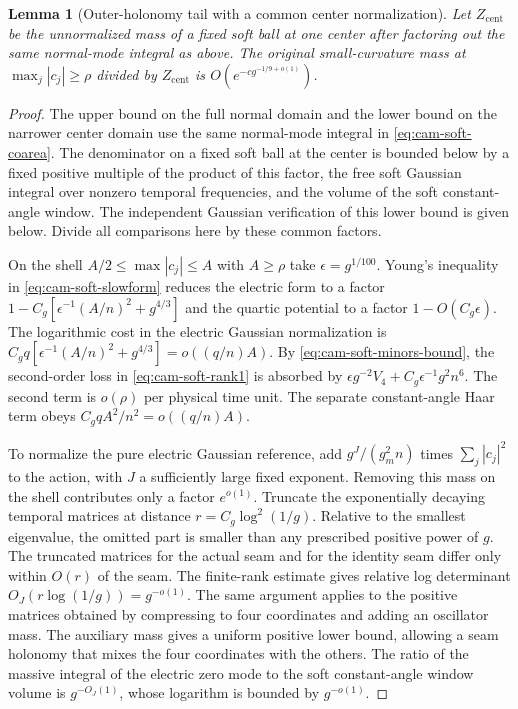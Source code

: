 \documentclass[11pt,a4paper]{article}
\newtheorem{lemma}[theorem]{Lemma}
\numberwithin{equation}{section}
\begin{document}
\begin{lemma}[Outer-holonomy tail with a common center normalization]\label{lem:cam-soft-tail}
Let \(Z_{\mathrm{cent}}\) be the unnormalized mass of a fixed soft ball at one center after factoring out the same normal-mode integral as above. The original small-curvature mass at \(\max_j|c_j|\ge\rho\) divided by \(Z_{\mathrm{cent}}\) is \(O(e^{-c g^{-1/9+o(1)}})\).
\end{lemma}

\begin{proof}
The upper bound on the full normal domain and the lower bound on the narrower center domain use the same normal-mode integral in \eqref{eq:cam-soft-coarea}. The denominator on a fixed soft ball at the center is bounded below by a fixed positive multiple of the product of this factor, the free soft Gaussian integral over nonzero temporal frequencies, and the volume of the soft constant-angle window. The independent Gaussian verification of this lower bound is given below. Divide all comparisons here by these common factors.

On the shell \(A/2\le\max|c_j|\le A\) with \(A\ge\rho\) take \(\epsilon=g^{1/100}\). Young's inequality in \eqref{eq:cam-soft-slowform} reduces the electric form to a factor \(1-C_g[\epsilon^{-1}(A/n)^2+g^{4/3}]\) and the quartic potential to a factor \(1-O(C_g\epsilon)\). The logarithmic cost in the electric Gaussian normalization is \(C_gq[\epsilon^{-1}(A/n)^2+g^{4/3}]=o((q/n)A)\). By \eqref{eq:cam-soft-minors-bound}, the second-order loss in \eqref{eq:cam-soft-rank1} is absorbed by \(\epsilon g^{-2}V_4+C_g\epsilon^{-1}g^2n^6\). The second term is \(o(\rho)\) per physical time unit. The separate constant-angle Haar term obeys \(C_g qA^2/n^2=o((q/n)A)\).

To normalize the pure electric Gaussian reference, add \(g^J/(g_m^2 n)\) times \(\sum_j|c_j|^2\) to the action, with \(J\) a sufficiently large fixed exponent. Removing this mass on the shell contributes only a factor \(e^{o(1)}\). Truncate the exponentially decaying temporal matrices at distance \(r=C_g\log^2(1/g)\). Relative to the smallest eigenvalue, the omitted part is smaller than any prescribed positive power of \(g\). The truncated matrices for the actual seam and for the identity seam differ only within \(O(r)\) of the seam. The finite-rank estimate gives relative log determinant \(O_J(r\log(1/g))=g^{-o(1)}\). The same argument applies to the positive matrices obtained by compressing to four coordinates and adding an oscillator mass. The auxiliary mass gives a uniform positive lower bound, allowing a seam holonomy that mixes the four coordinates with the others. The ratio of the massive integral of the electric zero mode to the soft constant-angle window volume is \(g^{-O_J(1)}\), whose logarithm is bounded by \(g^{-o(1)}\).


\end{proof}
\end{document}
